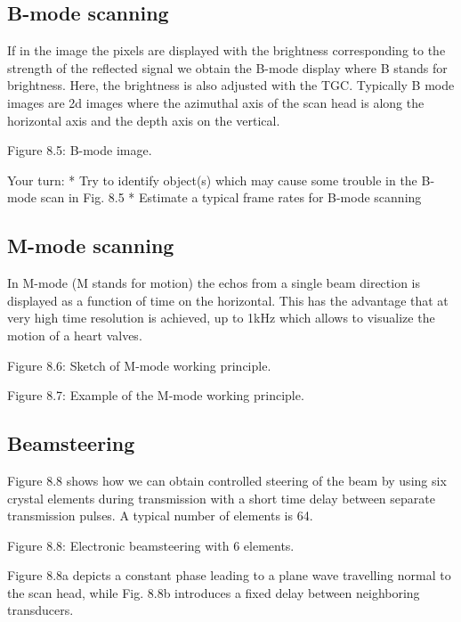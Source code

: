 \documentclass{article}
\begin{document}
    \begin{figure}
        \begin{center}\end{center}
        \caption{}
        \label{}
    \end{figure}
    \subsection{B-mode scanning}\label{b-mode-scanning}

If in the image the pixels are displayed with the brightness
corresponding to the strength of the reflected signal we obtain the
B-mode display where B stands for brightness. Here, the brightness is
also adjusted with the TGC. Typically B mode images are 2d images where
the azimuthal axis of the scan head is along the horizontal axis and the
depth axis on the vertical.

Figure 8.5: B-mode image.

Your turn: * Try to identify object(s) which may cause some trouble in
the B-mode scan in Fig. 8.5 * Estimate a typical frame rates for B-mode
scanning
\subsection{M-mode scanning}\label{m-mode-scanning}

In M-mode (M stands for motion) the echos from a single beam direction
is displayed as a function of time on the horizontal. This has the
advantage that at very high time resolution is achieved, up to 1kHz
which allows to visualize the motion of a heart valves.

Figure 8.6: Sketch of M-mode working principle.

Figure 8.7: Example of the M-mode working principle.
\subsection{Beamsteering}\label{beamsteering}

Figure 8.8 shows how we can obtain controlled steering of the beam by
using six crystal elements during transmission with a short time delay
between separate transmission pulses. A typical number of elements is
64.

Figure 8.8: Electronic beamsteering with 6 elements.

Figure 8.8a depicts a constant phase leading to a plane wave travelling
normal to the scan head, while Fig. 8.8b introduces a fixed delay
between neighboring transducers.
\end{document}
